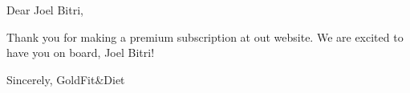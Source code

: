 \documentclass{article}
\begin{document}
Dear Joel Bitri,

Thank you for making a premium subscription at out website. We are excited to have you on board, Joel Bitri!

Sincerely,
GoldFit&Diet
\end{document}
